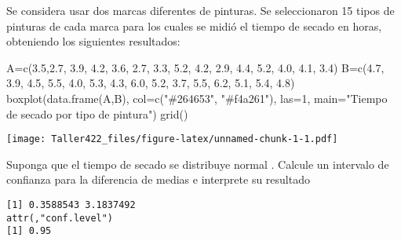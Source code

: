 \documentclass[
]{article}
\newenvironment{Shaded}{\begin{snugshade}}{\end{snugshade}}
\newcommand{\AttributeTok}[1]{\textcolor[rgb]{0.77,0.63,0.00}{#1}}
\newcommand{\DecValTok}[1]{\textcolor[rgb]{0.00,0.00,0.81}{#1}}
\newcommand{\FloatTok}[1]{\textcolor[rgb]{0.00,0.00,0.81}{#1}}
\newcommand{\FunctionTok}[1]{\textcolor[rgb]{0.00,0.00,0.00}{#1}}
\newcommand{\NormalTok}[1]{#1}
\newcommand{\OtherTok}[1]{\textcolor[rgb]{0.56,0.35,0.01}{#1}}
\newcommand{\SpecialCharTok}[1]{\textcolor[rgb]{0.00,0.00,0.00}{#1}}
\newcommand{\StringTok}[1]{\textcolor[rgb]{0.31,0.60,0.02}{#1}}
\begin{document}
Se considera usar dos marcas diferentes de pinturas. Se seleccionaron 15
tipos de pinturas de cada marca para los cuales se midió el tiempo de
secado en horas, obteniendo los siguientes resultados:

\begin{Shaded}
\begin{Highlighting}[]
\NormalTok{A}\OtherTok{=}\FunctionTok{c}\NormalTok{(}\FloatTok{3.5}\NormalTok{,}\FloatTok{2.7}\NormalTok{, }\FloatTok{3.9}\NormalTok{, }\FloatTok{4.2}\NormalTok{, }\FloatTok{3.6}\NormalTok{, }\FloatTok{2.7}\NormalTok{, }\FloatTok{3.3}\NormalTok{, }\FloatTok{5.2}\NormalTok{, }\FloatTok{4.2}\NormalTok{, }\FloatTok{2.9}\NormalTok{, }\FloatTok{4.4}\NormalTok{, }\FloatTok{5.2}\NormalTok{, }\FloatTok{4.0}\NormalTok{, }\FloatTok{4.1}\NormalTok{, }\FloatTok{3.4}\NormalTok{)}
\NormalTok{B}\OtherTok{=}\FunctionTok{c}\NormalTok{(}\FloatTok{4.7}\NormalTok{, }\FloatTok{3.9}\NormalTok{, }\FloatTok{4.5}\NormalTok{, }\FloatTok{5.5}\NormalTok{, }\FloatTok{4.0}\NormalTok{, }\FloatTok{5.3}\NormalTok{, }\FloatTok{4.3}\NormalTok{, }\FloatTok{6.0}\NormalTok{, }\FloatTok{5.2}\NormalTok{, }\FloatTok{3.7}\NormalTok{, }\FloatTok{5.5}\NormalTok{, }\FloatTok{6.2}\NormalTok{, }\FloatTok{5.1}\NormalTok{, }\FloatTok{5.4}\NormalTok{, }\FloatTok{4.8}\NormalTok{)}
\FunctionTok{boxplot}\NormalTok{(}\FunctionTok{data.frame}\NormalTok{(A,B), }\AttributeTok{col=}\FunctionTok{c}\NormalTok{(}\StringTok{"\#264653"}\NormalTok{, }\StringTok{"\#f4a261"}\NormalTok{), }\AttributeTok{las=}\DecValTok{1}\NormalTok{,}
        \AttributeTok{main=}\StringTok{"Tiempo de secado por tipo de pintura"}\NormalTok{)}
\FunctionTok{grid}\NormalTok{()}
\end{Highlighting}
\end{Shaded}

\texttt{[image: Taller422\_files/figure-latex/unnamed-chunk-1-1.pdf]}

Suponga que el tiempo de secado se distribuye normal . Calcule un
intervalo de confianza para la diferencia de medias e interprete su
resultado

\begin{Shaded}
\end{Shaded}

\begin{verbatim}
[1] 0.3588543 3.1837492
attr(,"conf.level")
[1] 0.95
\end{verbatim}
\end{document}
